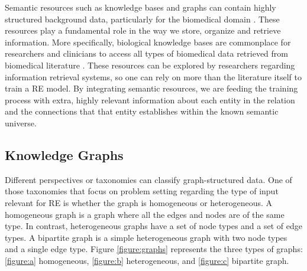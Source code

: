 Semantic resources such as knowledge bases and graphs can contain highly structured background data, particularly for the biomedical domain \citep{li2020bio}. These resources play a fundamental role in the way we store, organize and retrieve information. More specifically, biological knowledge bases are commonplace for researchers and clinicians to access all types of biomedical data retrieved from biomedical literature \citep{arnaboldi2020text}. These resources can be explored by researchers regarding information retrieval systems, so one can rely on more than the literature itself to train a RE model. By integrating semantic resources, we are feeding the training process with extra, highly relevant information about each entity in the relation and the connections that that entity establishes within the known semantic universe.


\subsection{Knowledge Graphs}

Different perspectives or taxonomies \citep{lee2019attention} can classify graph-structured data. One of those taxonomies that focus on problem setting regarding the type of input relevant for RE is whether the graph is homogeneous or heterogeneous. A homogeneous graph is a graph where all the edges and nodes are of the same type. In contrast, heterogeneous graphs have a set of node types and a set of edge types. A bipartite graph is a simple heterogeneous graph with two node types and a single edge type. Figure \ref{figure:graphs} represents the three types of graphs: \ref{figure:a} homogeneous, \ref{figure:b} heterogeneous, and \ref{figure:c} bipartite graph. 

